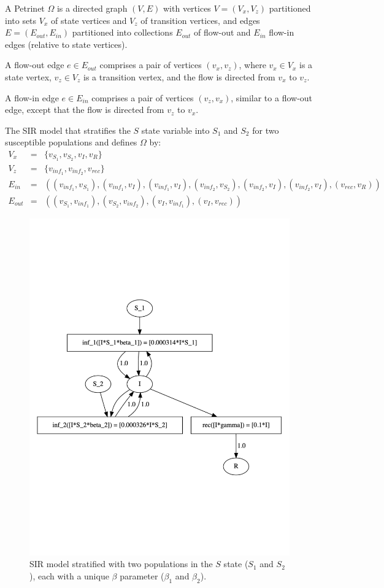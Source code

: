 \begin{definition}
    A Petrinet $\Omega$ is a directed graph $(V, E)$ with vertices $V=(V_x,
    V_z)$ partitioned into sets $V_x$ of state vertices and $V_z$ of transition
    vertices, and edges $E=(E_{out}, E_{in})$ partitioned into collections $E_{out}$ of
    flow-out and $E_{in}$ flow-in edges (relative to state vertices). 
\end{definition}



\begin{definition}
A flow-out edge $e \in E_{out}$ comprises a pair of vertices $(v_x,v_z)$, where
$v_x \in V_x$ is a state vertex, $v_z \in V_z$ is a transition vertex, and the
flow is directed from $v_x$ to $v_z$.  
\end{definition}

\begin{definition}
    A flow-in edge $e \in E_{in}$ comprises a pair of vertices $(v_z,v_x)$,
    similar to a flow-out edge, except that the flow is directed from $v_z$ to
    $v_x$.  
\end{definition}

\begin{example}
    The SIR model that stratifies the $S$ state variable into $S_1$ and $S_2$
    for two susceptible populations and defines $\Omega$ by:
    \begin{eqnarray*}
        V_x &=& \{v_{S_1}, v_{S_2}, v_{I}, v_{R}\}\\
        V_z &=& \{v_{inf_1}, v_{inf_2}, v_{rec}\}\\
        E_{in} &=& ((v_{inf_1}, v_{S_1}), (v_{inf_1}, v_{I}), (v_{inf_1}, v_{I}), (v_{inf_2}, v_{S_2}), (v_{inf_2}, v_{I}),
        (v_{inf_2}, v_{I}), (v_{rec}, v_{R}))\\
        E_{out} &=& ((v_{S_1}, v_{inf_1}), (v_{S_2}, v_{inf_2}),(v_{I}, v_{inf_1}), (v_{I}, v_{rec}))
    \end{eqnarray*}
\end{example}

\begin{figure}
\centering    \includegraphics[width=.5\linewidth]{fig/sir/sir_stratified_model.pdf}
    \caption{\label{fig:sir_stratified_model} SIR model stratified with two
    populations in the $S$ state ($S_1$ and $S_2$), each with a unique $\beta$
    parameter ($\beta_1$ and $\beta_2$).}
\end{figure}


